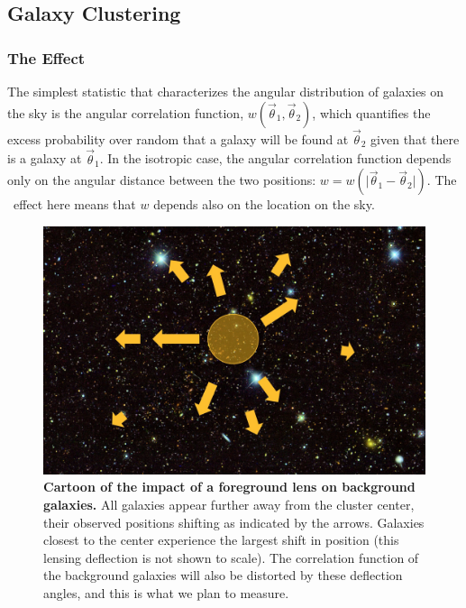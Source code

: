 \subsection{Galaxy Clustering}\label{sec:lia}


\subsubsection{The Effect}
The simplest statistic that
characterizes the angular distribution of galaxies on the sky is the
angular correlation function, $w(\vec\theta_1,\vec\theta_2)$, which
quantifies the excess probability over random that a galaxy will be
found at $\vec\theta_2$ given that there is a galaxy at
$\vec\theta_1$. In the isotropic case, the angular correlation function depends only on the angular distance
between the two positions: $w=w(\vert\vec\theta_1-\vec\theta_2\vert)$. The \atf\ effect here means
that $w$ depends also on the location on the sky.

\begin{figure}
  \begin{center}
    \includegraphics[scale=0.33]{figs/clusterfig.jpg}
  \end{center}
  \caption{ \footnotesize
{\bf Cartoon of the impact of a foreground lens on
  background galaxies.} All galaxies appear further away from the
  cluster center, their observed positions shifting as
  indicated by the arrows. Galaxies closest to the center experience
  the largest shift in position (this 
lensing deflection is not shown to scale). The correlation function
of the background galaxies will also be distorted by these deflection
angles, and this is what we plan to measure.}
  \label{cluster}
\end{figure}

